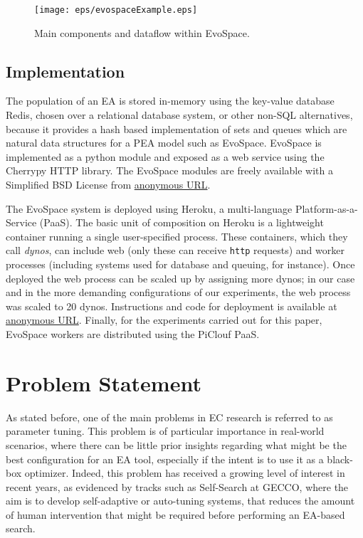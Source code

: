 \documentclass{sig-alternate}
\begin{document}
\begin{figure}[t]
    \centering
        \texttt{[image: eps/evospaceExample.eps]}
    \caption{Main components and dataflow within EvoSpace.}
    \label{fig:evo}
\end{figure}


\subsection{Implementation}
The population of an EA is stored in-memory using the key-value database Redis, chosen over a relational database system, or other non-SQL 
alternatives, because it provides a hash based implementation of sets  and queues which are natural data structures for a PEA model such as EvoSpace. 
EvoSpace is implemented as a python module and exposed as a web service using the Cherrypy HTTP library.
The EvoSpace modules are freely available with  a Simplified BSD License from \url{anonymous URL}.

The EvoSpace system is deployed using Heroku, a multi-language Platform-as-a-Service (PaaS).
The basic unit of composition on
Heroku is a lightweight container running a single user-specified process.
These containers, which they call {\em dynos}, can include web (only these can receive {\tt http} requests) and worker processes
(including systems used for database and queuing, for instance).
Once deployed the web process can be scaled up by assigning more dynos;
in our case and in the more demanding configurations of our experiments, 
the web process was scaled to 20 dynos. Instructions and code for deployment 
is available at \url{anonymous URL}.
Finally, for the experiments carried out for this paper, EvoSpace workers are distributed using the PiClouf PaaS.

\section{Problem Statement}
As stated before, one of the main problems in EC research is referred to as parameter tuning.
This problem is of particular importance in real-world scenarios, where there can be little prior insights regarding what might be the best
configuration for an EA tool, especially if the intent is to use it as a black-box optimizer.
Indeed, this problem has received a growing level of interest in recent years, as evidenced by tracks such as Self-Search at GECCO,
where the aim is to develop self-adaptive or auto-tuning systems, that reduces the amount of human intervention that might be required before performing
an EA-based search.
\end{document}

